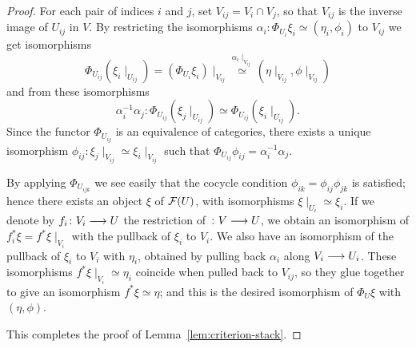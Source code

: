 \begin{4   STACKS}
\begin{4.2 Descent for quasi-coherent sheaves}
\begin{proof}
For each pair of indices $i$ and $j$, set $V_{ij} = V_{i} \cap V_{j}$, so that $V_{ij}$ is the inverse image of $U_{ij}$ in $V$. By restricting the isomorphisms $\alpha_{i}\colon \Phi_{U_{i}}\xi_{i} \simeq (\eta_{i}, \phi_{i})$ to $V_{ij}$ we get isomorphisms
   \[
   \Phi_{U_{ij}}(\xi_{i}\mid_{U_{ij}}) = (\Phi_{U_{i}}\xi_{i})\mid_{V_{ij}}
      \stackrel{\alpha_{i}\mid_{V_{ij}}}{\simeq}
      (\eta\mid_{V_{ij}}, \phi\mid_{V_{ij}})
   \]
and from these isomorphisms
   \[
   \alpha_{i}^{-1}\alpha_{j} \colon \Phi_{U_{ij}}(\xi_{j}\mid_{U_{ij}})
      \simeq \Phi_{U_{ij}}(\xi_{i}\mid_{U_{ij}}).
   \]
Since the functor $\Phi_{U_{ij}}$ is an equivalence of categories, there exists a unique isomorphism $\phi_{ij}\colon \xi_{j}\mid_{V_{ij}} \simeq \xi_{i}\mid_{V_{ij}}$ such that $\Phi_{U_{ij}}\phi_{ij} = \alpha_{i}^{-1}\alpha_{j}$.

By applying $\Phi_{U_{ijk}}$ we see easily that the cocycle condition $\phi_{ik} = \phi_{ij}\phi_{jk}$ is satisfied; hence there exists an object $\xi$ of $\mathcal{F}(U)$, with isomorphisms $\xi\mid_{U_{i}} \simeq \xi_{i}$. If we denote by $f_{i}\colon V_{i} \arr U$ the restriction of $\colon V \arr U$, we obtain an isomorphism of $f_{i}^{*}\xi = f^{*}\xi\mid_{V_{i}}$ with the pullback of $\xi_{i}$ to $V_{i}$. We also have an isomorphism of the pullback of $\xi_{i}$ to $V_{i}$ with $\eta_{i}$, obtained by pulling back $\alpha_{i}$ along $V_{i}\arr U_{i}$. These isomorphisms $f^{*}\xi\mid_{V_{i}} \simeq \eta_{i}$ coincide when pulled back to $V_{ij}$, so they glue together to give an isomorphism $f^{*}\xi \simeq \eta$; and this is the desired isomorphism of $\Phi_{U}\xi$  with $(\eta, \phi)$.

This completes the proof of Lemma~\ref{lem:criterion-stack}.
\end{proof}


\end{4.2 Descent for quasi-coherent sheaves}
\end{4   STACKS}
